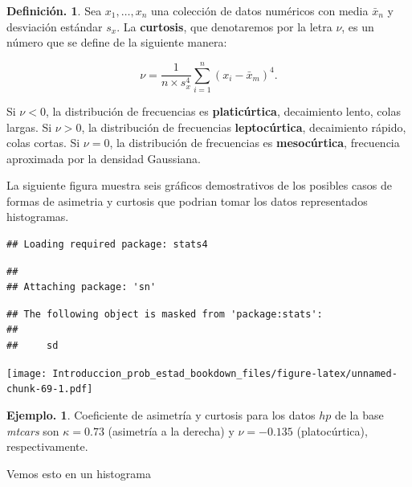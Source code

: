 \documentclass[]{book}
\newenvironment{Shaded}{\begin{snugshade}}{\end{snugshade}}
\newcommand{\DataTypeTok}[1]{\textcolor[rgb]{0.13,0.29,0.53}{#1}}
\newcommand{\KeywordTok}[1]{\textcolor[rgb]{0.13,0.29,0.53}{\textbf{#1}}}
\newcommand{\NormalTok}[1]{#1}
\newcommand{\OperatorTok}[1]{\textcolor[rgb]{0.81,0.36,0.00}{\textbf{#1}}}
\newcommand{\StringTok}[1]{\textcolor[rgb]{0.31,0.60,0.02}{#1}}
\theoremstyle{definition}
\newtheorem{definition}{Definición.}[chapter]
\theoremstyle{definition}
\newtheorem{example}{Ejemplo.}[chapter]
\theoremstyle{definition}
\theoremstyle{remark}
\begin{document}
\begin{definition}
\protect\hypertarget{def:unnamed-chunk-68}{}{\label{def:unnamed-chunk-68} }
Sea \(x_1, \ldots , x_n\) una colección de datos numéricos
con media \(\bar{x}_n\) y desviación
estándar \(s_x\). La \textbf{curtosis}, que denotaremos por la
letra \(\nu\), es un número que
se define de la siguiente manera:

\[ \nu =  \frac{1}{n \times s_x^4} \sum_{i=1}^n (x_i -
                                      \bar{x}_m)^4.\]

Si \(\nu<0\), la distribución de frecuencias es
\textbf{platicúrtica}, decaimiento lento, colas largas.
Si \(\nu>0\), la distribución de frecuencias
\textbf{leptocúrtica}, decaimiento rápido, colas cortas. Si
\(\nu=0\), la distribución de frecuencias es
\textbf{mesocúrtica}, frecuencia aproximada por la densidad
Gaussiana.
\end{definition}

La siguiente figura muestra seis gráficos demostrativos de los
posibles casos de formas de asimetria y curtosis que podrian tomar los
datos representados histogramas.

\begin{verbatim}
## Loading required package: stats4
\end{verbatim}

\begin{verbatim}
## 
## Attaching package: 'sn'
\end{verbatim}

\begin{verbatim}
## The following object is masked from 'package:stats':
## 
##     sd
\end{verbatim}

\texttt{[image: Introduccion\_prob\_estad\_bookdown\_files/figure-latex/unnamed-chunk-69-1.pdf]}

\begin{example}
\protect\hypertarget{exm:unnamed-chunk-70}{}{\label{exm:unnamed-chunk-70} }Coeficiente de asimetría y curtosis para los datos
\(hp\) de la base \emph{mtcars} son \(\kappa = 0.73\)
(asimetría a la derecha) y \(\nu = -0.135\)
(platocúrtica), respectivamente.
\end{example}

Vemos esto en un histograma

\begin{Shaded}
\end{Shaded}
\end{document}
